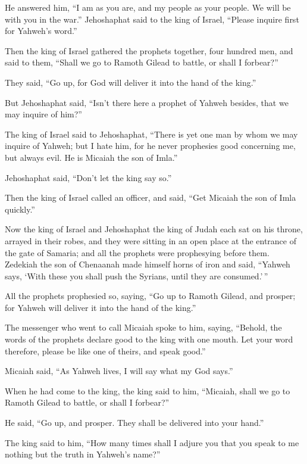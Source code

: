 He answered him, ``I am as you are, and my people as your people. We
will be with you in the war.''  Jehoshaphat said to the king
of Israel, ``Please inquire first for Yahweh's word.''

 Then the king of Israel gathered the prophets together,
four hundred men, and said to them, ``Shall we go to Ramoth Gilead to
battle, or shall I forbear?''

They said, ``Go up, for God will deliver it into the hand of the king.''

 But Jehoshaphat said, ``Isn't there here a prophet of
Yahweh besides, that we may inquire of him?''

 The king of Israel said to Jehoshaphat, ``There is yet one
man by whom we may inquire of Yahweh; but I hate him, for he never
prophesies good concerning me, but always evil. He is Micaiah the son of
Imla.''

Jehoshaphat said, ``Don't let the king say so.''

 Then the king of Israel called an officer, and said, ``Get
Micaiah the son of Imla quickly.''

 Now the king of Israel and Jehoshaphat the king of Judah
each sat on his throne, arrayed in their robes, and they were sitting in
an open place at the entrance of the gate of Samaria; and all the
prophets were prophesying before them.  Zedekiah the son of
Chenaanah made himself horns of iron and said, ``Yahweh says, `With
these you shall push the Syrians, until they are consumed.'\,''

 All the prophets prophesied so, saying, ``Go up to Ramoth
Gilead, and prosper; for Yahweh will deliver it into the hand of the
king.''

 The messenger who went to call Micaiah spoke to him,
saying, ``Behold, the words of the prophets declare good to the king
with one mouth. Let your word therefore, please be like one of theirs,
and speak good.''

 Micaiah said, ``As Yahweh lives, I will say what my God
says.''

 When he had come to the king, the king said to him,
``Micaiah, shall we go to Ramoth Gilead to battle, or shall I forbear?''

He said, ``Go up, and prosper. They shall be delivered into your hand.''

 The king said to him, ``How many times shall I adjure you
that you speak to me nothing but the truth in Yahweh's name?''

